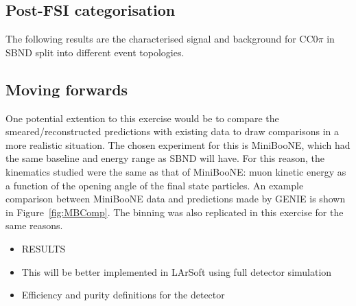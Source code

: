 \subsection{Post-FSI categorisation}

The following results are the characterised signal and background for CC0\(\pi\) in SBND split into different event topologies. 

\subsection{Moving forwards}

One potential extention to this exercise would be to compare the smeared/reconstructed predictions with existing data to draw comparisons in a more realistic situation. The chosen experiment for this is MiniBooNE, which had the same baseline and energy range as SBND will have. For this reason, the kinematics studied were the same as that of MiniBooNE: muon kinetic energy as a function of the opening angle of the final state particles. An example comparison between
MiniBooNE data and predictions made by GENIE is shown in Figure~\ref{fig:MBComp}. The binning was also replicated in this exercise for the same reasons.

    \begin{itemize}
        \item RESULTS
        \item This will be better implemented in LArSoft using full detector simulation
        \item Efficiency and purity definitions for the detector
    \end{itemize}


\clearpage
